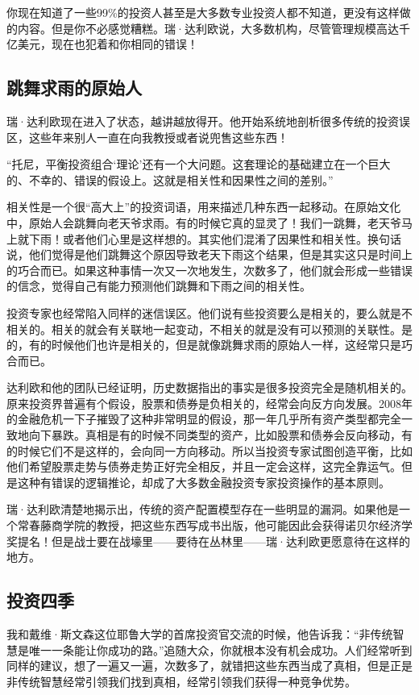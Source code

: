 你现在知道了一些99\%的投资人甚至是大多数专业投资人都不知道，更没有这样做的内容。但是你不必感觉糟糕。瑞·达利欧说，大多数机构，尽管管理规模高达千亿美元，现在也犯着和你相同的错误！

\subsection{跳舞求雨的原始人}

瑞·达利欧现在进入了状态，越讲越放得开。他开始系统地剖析很多传统的投资误区，这些年来别人一直在向我教授或者说兜售这些东西！

“托尼，平衡投资组合‘理论’还有一个大问题。这套理论的基础建立在一个巨大的、不幸的、错误的假设上。这就是相关性和因果性之间的差别。”

相关性是一个很“高大上”的投资词语，用来描述几种东西一起移动。在原始文化中，原始人会跳舞向老天爷求雨。有的时候它真的显灵了！我们一跳舞，老天爷马上就下雨！或者他们心里是这样想的。其实他们混淆了因果性和相关性。换句话说，他们觉得是他们跳舞这个原因导致老天下雨这个结果，但是其实这只是时间上的巧合而已。如果这种事情一次又一次地发生，次数多了，他们就会形成一些错误的信念，觉得自己有能力预测他们跳舞和下雨之间的相关性。

投资专家也经常陷入同样的迷信误区。他们说有些投资要么是相关的，要么就是不相关的。相关的就会有关联地一起变动，不相关的就是没有可以预测的关联性。是的，有的时候他们也许是相关的，但是就像跳舞求雨的原始人一样，这经常只是巧合而已。

达利欧和他的团队已经证明，历史数据指出的事实是很多投资完全是随机相关的。原来投资界普遍有个假设，股票和债券是负相关的，经常会向反方向发展。2008年的金融危机一下子摧毁了这种非常明显的假设，那一年几乎所有资产类型都完全一致地向下暴跌。真相是有的时候不同类型的资产，比如股票和债券会反向移动，有的时候它们不是这样的，会向同一方向移动。所以当投资专家试图创造平衡，比如他们希望股票走势与债券走势正好完全相反，并且一定会这样，这完全靠运气。但是这种有错误的逻辑推论，却成了大多数金融投资专家投资操作的基本原则。

瑞·达利欧清楚地揭示出，传统的资产配置模型存在一些明显的漏洞。如果他是一个常春藤商学院的教授，把这些东西写成书出版，他可能因此会获得诺贝尔经济学奖提名！但是战士要在战壕里——要待在丛林里——瑞·达利欧更愿意待在这样的地方。

\subsection{投资四季}

我和戴维·斯文森这位耶鲁大学的首席投资官交流的时候，他告诉我：“非传统智慧是唯一一条能让你成功的路。”追随大众，你就根本没有机会成功。人们经常听到同样的建议，想了一遍又一遍，次数多了，就错把这些东西当成了真相，但是正是非传统智慧经常引领我们找到真相，经常引领我们获得一种竞争优势。

